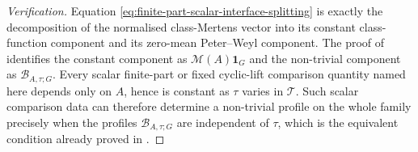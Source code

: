 \documentclass[11pt,a4paper]{amsart}
\theoremstyle{plain}
\theoremstyle{definition}
\theoremstyle{remark}
\begin{document}
\begin{proof}[Verification]
  Equation \eqref{eq:finite-part-scalar-interface-splitting} is exactly the
  decomposition of the normalised class-Mertens vector into its constant
  class-function component and its zero-mean Peter--Weyl component.  The proof
  of  identifies the constant
  component as \(\mathcal M(A)\mathbf1_G\) and the non-trivial component as
  \(\mathcal B_{A,\tau;G}\).  Every scalar finite-part or fixed cyclic-lift
  comparison quantity named here depends only on \(A\), hence is constant as
  \(\tau\) varies in \(\mathscr T\).  Such scalar comparison data can therefore
  determine a non-trivial profile on the whole family precisely when the
  profiles \(\mathcal B_{A,\tau;G}\) are independent of \(\tau\), which is the
  equivalent condition already proved in
  .
\end{proof}
\end{document}
